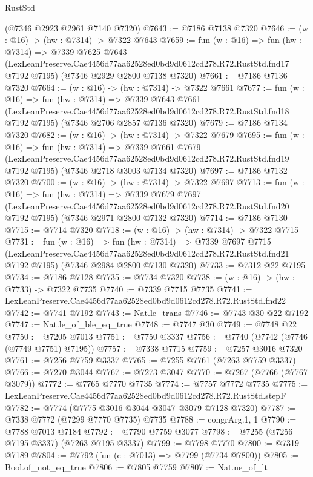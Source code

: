 \begin{lexlean}{RustStd}
\begin{coremodule}
    (@7346 @2923 @2961 @7140 @7320)
@7643 := @7186 @7138 @7320
@7646 := (w : @16) -> (hw : @7314) -> @7322 @7643
@7659 := fun (w : @16) =>
  fun (hw : @7314) =>
  @7339
    @7625
    @7643
    (LexLeanPreserve.Cae4456d77aa62528ed0bd9d0612cd278.R72.RustStd.fnd17 @7192 @7195)
    (@7346 @2929 @2800 @7138 @7320)
@7661 := @7186 @7136 @7320
@7664 := (w : @16) -> (hw : @7314) -> @7322 @7661
@7677 := fun (w : @16) =>
  fun (hw : @7314) =>
  @7339
    @7643
    @7661
    (LexLeanPreserve.Cae4456d77aa62528ed0bd9d0612cd278.R72.RustStd.fnd18 @7192 @7195)
    (@7346 @2706 @2857 @7136 @7320)
@7679 := @7186 @7134 @7320
@7682 := (w : @16) -> (hw : @7314) -> @7322 @7679
@7695 := fun (w : @16) =>
  fun (hw : @7314) =>
  @7339
    @7661
    @7679
    (LexLeanPreserve.Cae4456d77aa62528ed0bd9d0612cd278.R72.RustStd.fnd19 @7192 @7195)
    (@7346 @2718 @3003 @7134 @7320)
@7697 := @7186 @7132 @7320
@7700 := (w : @16) -> (hw : @7314) -> @7322 @7697
@7713 := fun (w : @16) =>
  fun (hw : @7314) =>
  @7339
    @7679
    @7697
    (LexLeanPreserve.Cae4456d77aa62528ed0bd9d0612cd278.R72.RustStd.fnd20 @7192 @7195)
    (@7346 @2971 @2800 @7132 @7320)
@7714 := @7186 @7130
@7715 := @7714 @7320
@7718 := (w : @16) -> (hw : @7314) -> @7322 @7715
@7731 := fun (w : @16) =>
  fun (hw : @7314) =>
  @7339
    @7697
    @7715
    (LexLeanPreserve.Cae4456d77aa62528ed0bd9d0612cd278.R72.RustStd.fnd21 @7192 @7195)
    (@7346 @2984 @2800 @7130 @7320)
@7733 := @7312 @22 @7195
@7734 := @7186 @7128
@7735 := @7734 @7320
@7738 := (w : @16) -> (hw : @7733) -> @7322 @7735
@7740 := @7339 @7715 @7735
@7741 := LexLeanPreserve.Cae4456d77aa62528ed0bd9d0612cd278.R72.RustStd.fnd22
@7742 := @7741 @7192
@7743 := Nat.le_trans
@7746 := @7743 @30 @22 @7192
@7747 := Nat.le_of_ble_eq_true
@7748 := @7747 @30
@7749 := @7748 @22
@7750 := @7205 @7013
@7751 := @7750 @3337
@7756 := @7740 (@7742 (@7746 (@7749 @7751) @7195))
@7757 := @7338 @7715
@7759 := @7257 @3016 @7320
@7761 := @7256 @7759 @3337
@7765 := @7255 @7761 (@7263 @7759 @3337)
@7766 := @7270 @3044
@7767 := @7273 @3047
@7770 := @7267 (@7766 (@7767 @3079))
@7772 := @7765 @7770 @7735
@7774 := @7757 @7772 @7735
@7775 := LexLeanPreserve.Cae4456d77aa62528ed0bd9d0612cd278.R72.RustStd.stepF
@7782 := @7774 (@7775 @3016 @3044 @3047 @3079 @7128 @7320)
@7787 := @7338 @7772 (@7299 @7770 @7735) @7735
@7788 := congrArg.{1, 1}
@7790 := @7788 @7013 @7184
@7792 := @7790 @7759 @3077
@7798 := @7255 (@7256 @7195 @3337) (@7263 @7195 @3337)
@7799 := @7798 @7770
@7800 := @7319 @7189
@7804 := @7792 (fun (c : @7013) => @7799 (@7734 @7800))
@7805 := Bool.of_not_eq_true
@7806 := @7805 @7759
@7807 := Nat.ne_of_lt

\end{coremodule}
\end{lexlean}
